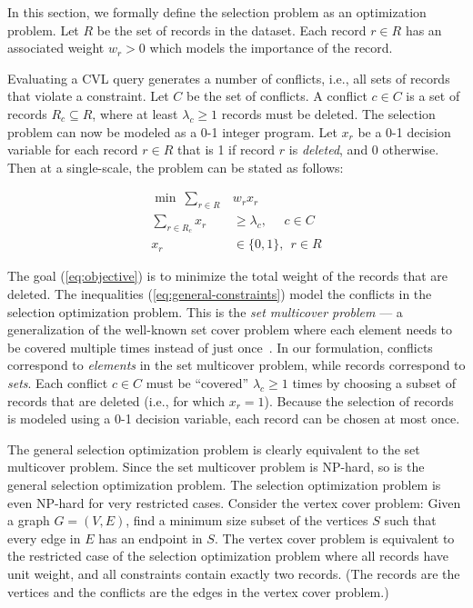 \documentclass[11pt, oneside]{report}
\begin{document}
In this section, we formally define the selection problem as an optimization problem. Let $R$ be the set of records in the dataset. Each record $r \in R$ has an associated weight $w_r > 0$ which models the importance of the record. 

Evaluating a CVL query generates a number of conflicts, i.e., all sets of records that violate a constraint. Let $C$ be the set of conflicts. A conflict $c \in C$ is a set of records $R_c \subseteq R$, where at least $\lambda_c \geq 1$ records must be deleted. The selection problem can now be modeled as a 0-1 integer program. Let $x_r$ be a 0-1 decision variable for each record $r \in R$ that is 1 if record $r$ is \emph{deleted}, and 0 otherwise. Then at a single-scale, the problem can be stated as follows:

\begin{align}
  \label{eq:objective}
  \min ~\sum_{r \in R} &w_r x_r \\
  \label{eq:general-constraints}
  \sum_{r \in R_c} x_r &\geq \lambda_c, ~~~~~~ c \in C \\
  x_r & \in \{0, 1\}, ~~ r \in R
\end{align}

The goal (\ref{eq:objective}) is to minimize the total weight of the records that are deleted. The inequalities (\ref{eq:general-constraints}) model the conflicts in the selection optimization problem. This is the \emph{set multicover problem} --- a generalization of the well-known set cover problem where each element needs to be covered multiple times instead of just once~\cite{rajagopalan1998primal}. In our formulation, conflicts correspond to \textit{elements} in the set multicover problem, while records correspond to \textit{sets}. Each conflict $c \in C$ must be ``covered'' $\lambda_c \geq 1$ times by choosing a subset of records that are deleted (i.e., for which $x_r=1$). Because the selection of records is modeled using a 0-1 decision variable, each record can be chosen at most once.

The general selection optimization problem is clearly equivalent to the set multicover problem. Since the set multicover problem is NP-hard, so is the general selection optimization problem. The selection optimization problem is even NP-hard for very restricted cases. Consider the vertex cover problem: Given a graph $G=(V,E)$, find a minimum size subset of the vertices $S$ such that every edge in $E$ has an endpoint in $S$. The vertex cover problem is equivalent to the restricted case of the selection optimization problem where all records have unit weight, and all constraints contain exactly two records. (The records are the vertices and the conflicts are the edges in the vertex cover problem.)
\end{document}
